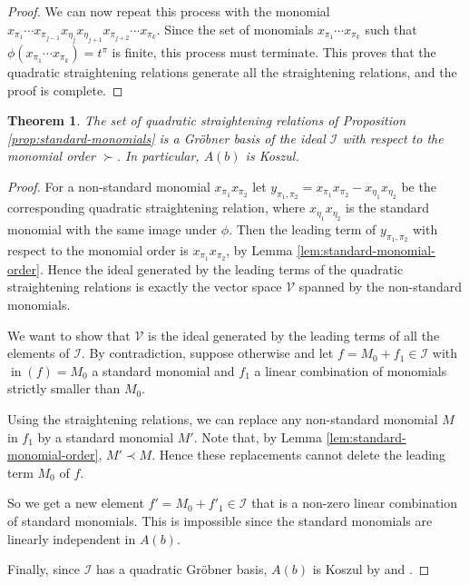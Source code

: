 \documentclass[12pt, a4paper]{amsart}   	%
\numberwithin{equation}{section}
\theoremstyle{plain}
\newtheorem{theorem}{Theorem}[section]
\theoremstyle{definition}
\newcommand{\mcI}{{\mathcal I}}
\DeclareMathOperator{\initial}{in}
\begin{document}
\begin{proof}
We can now repeat this process with the monomial $x_{\pi_1}\cdots x_{\pi_{j-1}}x_{\eta_j}x_{\eta_{j+1}}x_{\pi_{j+2}}\cdots x_{\pi_k}$. Since the set of monomials $x_{\pi_1}\cdots x_{\pi_k}$ such that $\phi(x_{\pi_1}\cdots x_{\pi_k}) = t^\pi$ is finite, this process must terminate. This proves that the quadratic straightening relations generate all the straightening relations, and the proof is complete.
\end{proof}

\begin{theorem}\label{thm:quadratic-Groebner}
    The set of quadratic straightening relations of Proposition \ref{prop:standard-monomials} is a Gr\"obner basis of the ideal $\mcI$ with respect to the monomial order $\succ$. In particular, $A(b)$ is Koszul.
\end{theorem}
\begin{proof}
    For a non-standard monomial $x_{\pi_1}x_{\pi_2}$ let $y_{\pi_1,\pi_2} = x_{\pi_1}x_{\pi_2} - x_{\eta_1}x_{\eta_2}$ be the corresponding quadratic straightening relation, where $x_{\eta_1}x_{\eta_2}$ is the standard monomial with the same image under $\phi$. Then the leading term of $y_{\pi_1,\pi_2}$ with respect to the monomial order is $x_{\pi_1}x_{\pi_2}$, by Lemma \ref{lem:standard-monomial-order}. Hence the ideal generated by the leading terms of the quadratic straightening relations is exactly the vector space $\mathcal{V}$ spanned by the non-standard monomials.
    
    We want to show that $\mathcal{V}$ is the ideal generated by the leading terms of all the elements of $\mcI$. By contradiction, suppose otherwise and let $f = M_0 + f_1\in\mcI$ with $\initial(f) = M_0$ a standard monomial and $f_1$ a linear combination of monomials strictly smaller than $M_0$. 
    
    Using the straightening relations, we can replace any non-standard monomial $M$ in $f_1$ by a  standard monomial $M'$. Note that, by Lemma \ref{lem:standard-monomial-order}, $M' \prec M$. Hence these replacements cannot delete the leading term $M_0$ of $f$.

    So we get a new element $f' = M_0 + f'_1\in \mcI$ that is a non-zero linear combination of standard monomials. This is impossible since the standard monomials are linearly independent in $A(b)$.

    Finally, since $\mcI$ has a quadratic Gr\"obner basis, $A(b)$ is Koszul by \cite{Froberg} and \cite{Anick}.
\end{proof}
\end{document}
